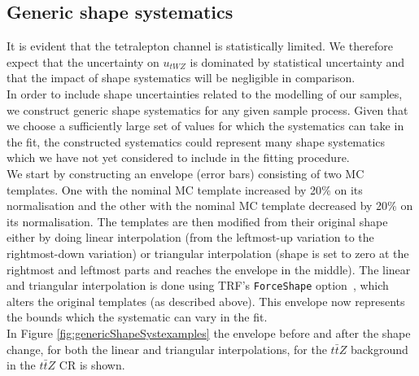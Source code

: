 \subsection{Generic shape systematics}
\label{sec:genericShapeSyst}

It is evident that the tetralepton channel is statistically limited. We therefore expect that the uncertainty on $u_{tWZ}$ is dominated by statistical uncertainty and that the impact of shape systematics will be negligible in comparison.\\

In order to include shape uncertainties related to the modelling of our samples, we construct generic shape systematics for any given sample process. Given that we choose a sufficiently large set of values for which the systematics can take in the fit, the constructed systematics could represent many shape systematics which we have not yet considered to include in the fitting procedure.\\

We start by constructing an envelope (error bars) consisting of two MC templates. One with the nominal MC template increased by 20$\%$ on its normalisation and the other with the nominal MC template decreased by 20$\%$ on its normalisation. The templates are then modified from their original shape either by doing linear interpolation (from the leftmost-up variation to the rightmost-down variation) or triangular interpolation (shape is set to zero at the rightmost and leftmost parts and reaches the envelope in the middle). The linear and triangular interpolation is done using TRF's \texttt{ForceShape} option~\cite{TRF-ForceShape}, which alters the original templates (as described above). This envelope now represents the bounds which the systematic can vary in the fit.\\

In Figure \ref{fig:genericShapeSystexamples} the envelope before and after the shape change, for both the linear and triangular interpolations, for the $t\bar{t}Z$ background in the $t\bar{t}Z$ CR is shown.

